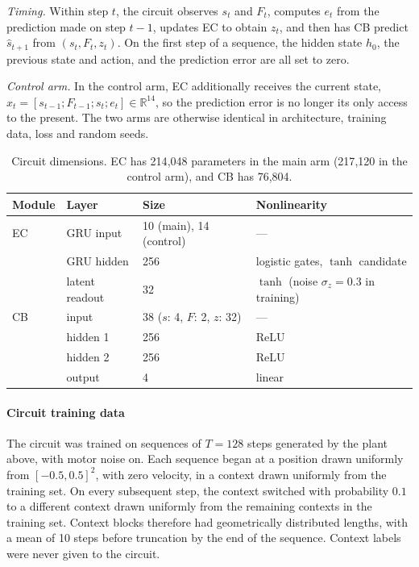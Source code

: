 \textit{Timing.} Within step $t$, the circuit observes $s_t$ and $F_t$, computes $e_t$ from the prediction made on step $t-1$, updates EC to obtain $z_t$, and then has CB predict $\hat{s}_{t+1}$ from $(s_t, F_t, z_t)$. On the first step of a sequence, the hidden state $h_0$, the previous state and action, and the prediction error are all set to zero.

\textit{Control arm.} In the control arm, EC additionally receives the current state, $x_t = [s_{t-1}; F_{t-1}; s_t; e_t] \in \mathbb{R}^{14}$, so the prediction error is no longer its only access to the present. The two arms are otherwise identical in architecture, training data, loss and random seeds.

\begin{table}[h]
\centering
\begin{tabular}{llll}
\hline
Module & Layer & Size & Nonlinearity \\
\hline
EC & GRU input & 10 (main), 14 (control) & --- \\
   & GRU hidden & 256 & logistic gates, $\tanh$ candidate \\
   & latent readout & 32 & $\tanh$ (noise $\sigma_z = 0.3$ in training) \\
CB & input & 38 ($s$: 4, $F$: 2, $z$: 32) & --- \\
   & hidden 1 & 256 & ReLU \\
   & hidden 2 & 256 & ReLU \\
   & output & 4 & linear \\
\hline
\end{tabular}
\caption{Circuit dimensions. EC has 214{,}048 parameters in the main arm (217{,}120 in the control arm), and CB has 76{,}804.}
\label{tab:circuit}
\end{table}

\paragraph{Circuit training data}
The circuit was trained on sequences of $T = 128$ steps generated by the plant above, with motor noise on. Each sequence began at a position drawn uniformly from $[-0.5, 0.5]^2$, with zero velocity, in a context drawn uniformly from the training set. On every subsequent step, the context switched with probability $0.1$ to a different context drawn uniformly from the remaining contexts in the training set. Context blocks therefore had geometrically distributed lengths, with a mean of 10 steps before truncation by the end of the sequence. Context labels were never given to the circuit.

